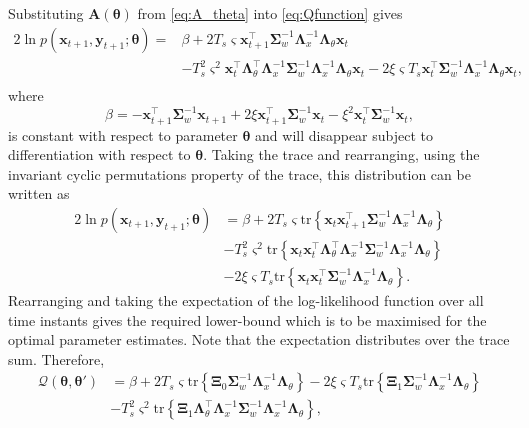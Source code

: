 \documentclass[review,authoryear,3p]{elsarticle}
\begin{document}
Substituting $\mathbf A( \boldsymbol\theta)$ from \eqref{eq:A_theta} into \eqref{eq:Qfunction} gives
\begin{align}
2\ln p(\mathbf x_{t+1}, \mathbf y_{t+1};\boldsymbol\theta)=&\beta+2 T_s\varsigma\mathbf x_{t+1}^\top\boldsymbol\Sigma_w^{-1}\boldsymbol\Lambda_x^{-1}\boldsymbol\Lambda_{\theta}\mathbf x_t \nonumber \\
&-T_s^2\varsigma^2\mathbf x_t^\top \boldsymbol\Lambda_{\theta}^\top\boldsymbol\Lambda_x^{-1}\boldsymbol\Sigma_w^{-1}\boldsymbol\Lambda_x^{-1}\boldsymbol\Lambda_{\theta}\mathbf x_t-2\xi \varsigma T_s\mathbf x_t^\top\boldsymbol\Sigma_w^{-1}\boldsymbol\Lambda_x^{-1}\boldsymbol\Lambda_{\theta}\mathbf x_t,\nonumber \\
\end{align}
where 
\begin{equation}
\beta=-\mathbf x_{t+1}^\top\boldsymbol\Sigma_w^{-1}\mathbf x_{t+1}+2\xi\mathbf x_{t+1}^\top\boldsymbol\Sigma_w^{-1}\mathbf x_t-\xi^2\mathbf x_t^\top\boldsymbol\Sigma_w^{-1}\mathbf x_t,
\end{equation}
is constant with respect to parameter $\boldsymbol\theta$ and will disappear subject to differentiation with respect to $\boldsymbol\theta$. Taking the trace and rearranging, using the invariant cyclic permutations property of the trace, this distribution can be written as
\begin{align}\label{eq:Qfunctionintrace}
2\ln p(\mathbf x_{t+1}, \mathbf y_{t+1};\boldsymbol\theta)&=\beta+2 T_s\varsigma\mathrm{tr} \left\lbrace \mathbf x_t\mathbf x_{t+1}^\top\boldsymbol\Sigma_w^{-1}\boldsymbol\Lambda_x^{-1}\boldsymbol\Lambda_{\theta}\right\rbrace \nonumber \\
&-T_s^2\varsigma^2\mathrm{tr} \left\lbrace \mathbf x_t\mathbf x_t^\top \boldsymbol\Lambda_{\theta}^\top\boldsymbol\Lambda_x^{-1}\boldsymbol\Sigma_w^{-1}\boldsymbol\Lambda_x^{-1}\boldsymbol\Lambda_{\theta}\right\rbrace\nonumber \\
&-2\xi\varsigma T_s\mathrm{tr} \left\lbrace \mathbf x_t\mathbf x_{t}^\top\boldsymbol\Sigma_w^{-1}\boldsymbol\Lambda_x^{-1}\boldsymbol\Lambda_{\theta}\right\rbrace.
\end{align}
Rearranging and taking the expectation of the log-likelihood function over all time instants gives the required lower-bound which is to be maximised for the optimal parameter estimates. Note that the expectation distributes over the trace sum. Therefore, 
\begin{align}\label{eq:MRA-QintermsofTraces}
\mathcal Q(\boldsymbol \theta, \boldsymbol\theta')&=\beta+2 T_s\varsigma\mathrm{tr} \left\lbrace \boldsymbol \Xi_0\boldsymbol\Sigma_w^{-1}\boldsymbol\Lambda_x^{-1}\boldsymbol\Lambda_{\theta}\right\rbrace-2\xi\varsigma T_s\mathrm{tr} \left\lbrace \boldsymbol\Xi_1\boldsymbol\Sigma_w^{-1}\boldsymbol\Lambda_x^{-1}\boldsymbol\Lambda_{\theta}\right\rbrace \nonumber \\
&-T_s^2\varsigma^2\mathrm{tr} \left\lbrace \boldsymbol\Xi_1 \boldsymbol\Lambda_{\theta}^\top\boldsymbol\Lambda_x^{-1}\boldsymbol\Sigma_w^{-1}\boldsymbol\Lambda_x^{-1}\boldsymbol\Lambda_{\theta}\right\rbrace,
\end{align}
\end{document}
